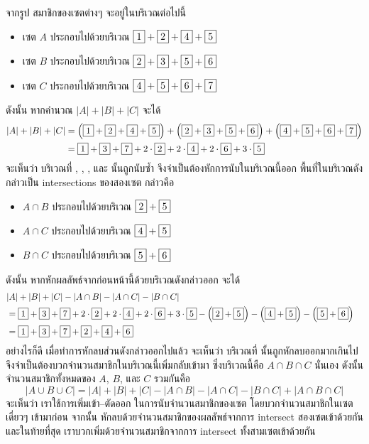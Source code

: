 \begin{example}
จากรูป สมาชิกของเซตต่างๆ จะอยู่ในบริเวณต่อไปนี้
\begin{itemize}[]
\item เซต $A$ ประกอบไปด้วยบริเวณ $\fbox{1}+\fbox{2}+\fbox{4}+\fbox{5}$
\item เซต $B$ ประกอบไปด้วยบริเวณ $\fbox{2}+\fbox{3}+\fbox{5}+\fbox{6}$
\item เซต $C$ ประกอบไปด้วยบริเวณ $\fbox{4}+\fbox{5}+\fbox{6}+\fbox{7}$
\end{itemize}
ดังนั้น หากคำนวณ $|A|+|B|+|C|$ จะได้
\begin{align*}
|A|+|B|+|C|
&= \left(\fbox{1}+\fbox{2}+\fbox{4}+\fbox{5}\right) + \left(\fbox{2}+\fbox{3}+\fbox{5}+\fbox{6}\right) + \left(\fbox{4}+\fbox{5}+\fbox{6}+\fbox{7}\right) \\
&= \fbox{1}+\fbox{3}+\fbox{7}+2\cdot\fbox{2}+2\cdot\fbox{4}+2\cdot\fbox{6}+3\cdot\fbox{5}
\end{align*}
จะเห็นว่า บริเวณที่ , , , และ  นั้นถูกนับซ้ำ จึงจำเป็นต้องหักการนับในบริเวณนี้ออก \enskip พื้นที่ในบริเวณดังกล่าวเป็น intersections ของสองเซต กล่าวคือ
\begin{itemize}[]
\item $A\cap B$ ประกอบไปด้วยบริเวณ $\fbox{2}+\fbox{5}$
\item $A\cap C$ ประกอบไปด้วยบริเวณ $\fbox{4}+\fbox{5}$
\item $B\cap C$ ประกอบไปด้วยบริเวณ $\fbox{5}+\fbox{6}$
\end{itemize}
ดังนั้น หากหักผลลัพธ์จากก่อนหน้านี้ด้วยบริเวณดังกล่าวออก จะได้
\begin{align*}
\lefteqn{|A|+|B|+|C|-|A\cap B|-|A\cap C|-|B\cap C|} \\
&= \cnode{1}+\cnode{3}+\cnode{7}+2\cdot\cnode{2}+2\cdot\cnode{4}+2\cdot\cnode{6}+3\cdot\cnode{5} - \left(\cnode{2}+\cnode{5}\right) - \left(\cnode{4}+\cnode{5}\right) - \left(\cnode{5}+\cnode{6}\right) \\
&= \cnode{1}+\cnode{3}+\cnode{7}+\cnode{2}+\cnode{4}+\cnode{6}
\end{align*}
อย่างไรก็ดี เมื่อทำการหักลบส่วนดังกล่าวออกไปแล้ว จะเห็นว่า บริเวณที่  นั้นถูกหักลบออกมากเกินไป จึงจำเป็นต้องบวกจำนวนสมาชิกในบริเวณนี้เพิ่มกลับเข้ามา ซึ่งบริเวณนี้คือ $A\cap B\cap C$ นั่นเอง \enskip ดังนั้น จำนวนสมาชิกทั้งหมดของ $A$, $B$, และ $C$ รวมกันคือ
\[|A\cup B\cup C|=|A|+|B|+|C|-|A\cap B|-|A\cap C|-|B\cap C|+|A\cap B\cap C|\]
จะเห็นว่า เราใช้การเพิ่มเข้า--ตัดออก ในการนับจำนวนสมาชิกของเซต โดยบวกจำนวนสมาชิกในเซตเดี่ยวๆ เข้ามาก่อน จากนั้น หักลบด้วยจำนวนสมาชิกของผลลัพธ์จากการ intersect สองเซตเข้าด้วยกัน และในท้ายที่สุด เราบวกเพิ่มด้วยจำนวนสมาชิกจากการ intersect ทั้งสามเซตเข้าด้วยกัน
\end{example}

